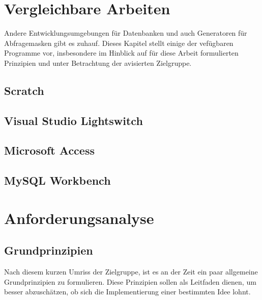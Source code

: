 \documentclass[paper=a4,fontsize=11pt,parskip=half]{scrartcl}
\begin{document}
\section{Vergleichbare Arbeiten}

Andere Entwicklungsumgebungen für Datenbanken und auch Generatoren für Abfragemasken gibt es zuhauf. Dieses Kapitel stellt einige der vefügbaren Programme vor, insbesondere im Hinblick auf für diese Arbeit formulierten Prinzipien und unter Betrachtung der avisierten Zielgruppe.

\subsection{Scratch}


\subsection{Visual Studio Lightswitch}


\subsection{Microsoft Access}


\subsection{MySQL Workbench}


\section{Anforderungsanalyse}

\subsection{Grundprinzipien}

Nach diesem kurzen Umriss der Zielgruppe, ist es an der Zeit ein paar allgemeine Grundprinzipien zu formulieren. Diese Prinzipien sollen als Leitfaden dienen, um besser abzuschätzen, ob sich die Implementierung einer bestimmten Idee lohnt.
\end{document}
